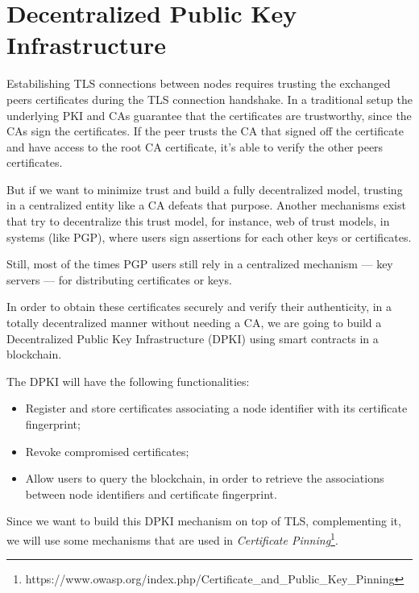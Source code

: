 
\section{Decentralized Public Key Infrastructure} \label{ssec:blockchain}

Estabilishing \ac{TLS} connections between nodes requires trusting the exchanged peers certificates during the \ac{TLS} connection handshake.
In a traditional setup the underlying \ac{PKI} and \acp{CA} guarantee that the certificates are trustworthy, since the \acp{CA} sign the certificates.
If the peer trusts the \ac{CA} that signed off the certificate and have access to the root \ac{CA} certificate, it's able to verify the other peers certificates.

But if we want to minimize trust and build a fully decentralized model, trusting in a centralized entity like a \ac{CA} defeats that purpose.
Another mechanisms exist that try to decentralize this trust model, for instance, web of trust models, in systems (like \ac{PGP}), where users sign assertions for each other keys or certificates.

Still, most of the times \ac{PGP} users still rely in a centralized mechanism — key servers — for distributing certificates or keys.

In order to obtain these certificates securely and verify their authenticity, in a totally decentralized manner without needing a CA, we are going to build a Decentralized Public Key Infrastructure (DPKI) using smart contracts in a blockchain.

The DPKI will have the following functionalities:
\begin{itemize}
	\item Register and store certificates associating a node identifier with its certificate fingerprint;
	\item Revoke compromised certificates;
	\item Allow users to query the blockchain, in order to retrieve the associations between node identifiers and certificate fingerprint.
\end{itemize}

Since we want to build this DPKI mechanism on top of TLS, complementing it, we will use some mechanisms that are used in \textit{Certificate Pinning}\footnote{https://www.owasp.org/index.php/Certificate\_and\_Public\_Key\_Pinning}.

